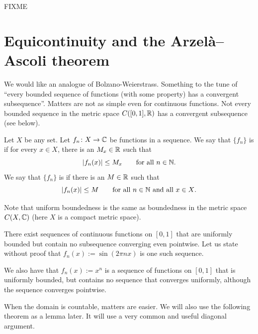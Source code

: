 FIXME


\sectionnewpage
\section{Equicontinuity and the Arzel{\` a}--Ascoli theorem}
\label{sec:FIXME}


We would like an analogue of Bolzano-Weierstrass.  Something to the tune of
``every bounded
sequence of functions (with some property) has a convergent subsequence''.
Matters are not
as simple even for continuous functions. 
Not every bounded sequence in the metric space $C([0,1],{\mathbb{R}})$ has
a convergent subsequence (see below).

\begin{defn}
Let $X$ be any set.
Let $f_n \colon X \to {\mathbb{C}}$ be functions in a sequence.  We say that
$\{ f_n \}$
is \emph{} if for every $x \in X$, there is an $M_x \in {\mathbb{R}}$
such that
\begin{equation*}
\lvert {f_n(x)} \rvert \leq M_x \qquad \text{for all $n \in {\mathbb{N}}$} .
\end{equation*}
We say that
$\{ f_n \}$
is \emph{} if there is an $M \in {\mathbb{R}}$
such that
\begin{equation*}
\lvert {f_n(x)} \rvert \leq M \qquad \text{for all $n \in {\mathbb{N}}$ and all $x \in X$}.
\end{equation*}
\end{defn}

Note that uniform boundedness is the same as boundedness in the metric space
$C(X,{\mathbb{C}})$ (here $X$ is a compact metric space).

\begin{example}
There exist sequences of 
continuous functions
on $[0,1]$ that are uniformly bounded but contain no subsequence converging
even pointwise.  Let us state without proof that $f_n(x) := \sin (2\pi n x)$ is one
such sequence.
\end{example}

\begin{example}
We also have that $f_n(x) := x^n$ is a sequence of functions on $[0,1]$
that is uniformly bounded, but contains no sequence that converges
uniformly,
although the sequence converges pointwise.
\end{example}

When the domain is countable, matters are easier.  We will also use the
following theorem as a lemma later.  It will use a very common and useful
diagonal argument.

